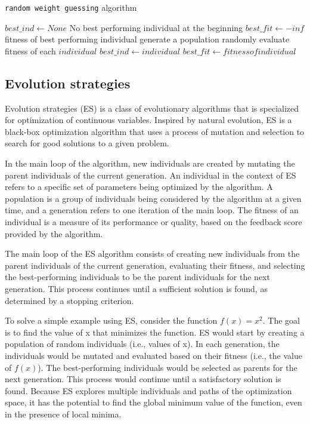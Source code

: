 \begin{algorithm}
\caption{\texttt{random weight guessing} algorithm}
\label{algo:random_weight_guessing}
\begin{algorithmic}[1]
\State $best\_ind \gets None$ \Comment No best performing individual at the beginning
\State $best\_fit \gets -inf$ \Comment fitness of best performing individual
  \State generate a population randomly
  \State evaluate fitness of each $individual$ 
    \State $best\_ind \gets individual$
    \State $best\_fit \gets fitness of individual$
  \EndIf
\EndWhile
\end{algorithmic}
\end{algorithm}


\subsection{Evolution strategies}


Evolution strategies (ES) is a class of evolutionary algorithms that is specialized for optimization of continuous variables. Inspired by natural evolution, ES is a black-box optimization algorithm that uses a process of mutation and selection to search for good solutions to a given problem. 

In the main loop of the algorithm, new individuals are created by mutating the parent individuals of the current generation. An individual in the context of ES refers to a specific set of parameters being optimized by the algorithm. A population is a group of individuals being considered by the algorithm at a given time, and a generation refers to one iteration of the main loop. The fitness of an individual is a measure of its performance or quality, based on the feedback score provided by the algorithm.

The main loop of the ES algorithm consists of creating new individuals from the parent individuals of the current generation, evaluating their fitness, and selecting the best-performing individuals to be the parent individuals for the next generation. This process continues until a sufficient solution is found, as determined by a stopping criterion.

To solve a simple example using ES, consider the function $f(x) = x^2$. The goal is to find the value of x that minimizes the function. ES would start by creating a population of random individuals (i.e., values of x). In each generation, the individuals would be mutated and evaluated based on their fitness (i.e., the value of $f(x)$). The best-performing individuals would be selected as parents for the next generation. This process would continue until a satisfactory solution is found. Because ES explores multiple individuals and paths of the optimization space, it has the potential to find the global minimum value of the function, even in the presence of local minima.

